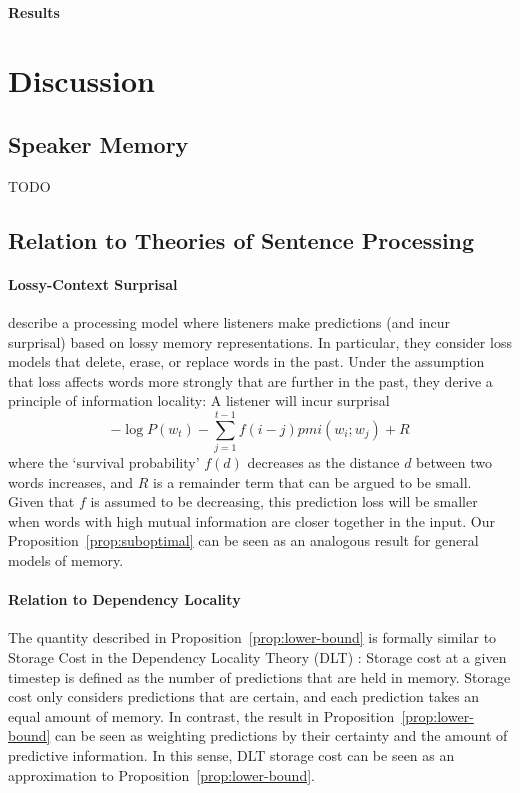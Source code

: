 \documentclass[11pt,letterpaper]{article}
\begin{document}
\paragraph{Results}


\section{Discussion}

\subsection{Speaker Memory}

TODO

\subsection{Relation to Theories of Sentence Processing}


\paragraph{Lossy-Context Surprisal}
\citet{futrell-noisy-context-2017} describe a processing model where listeners make predictions (and incur surprisal) based on lossy memory representations.
In particular, they consider loss models that delete, erase, or replace words in the past.
Under the assumption that loss affects words more strongly that are further in the past, they derive a principle of information locality:
A listener will incur surprisal
$$ -\log P(w_t) - \sum_{j=1}^{t-1} f(i-j) pmi(w_i; w_j) + R$$
where the `survival probability' $f(d)$ decreases as the distance $d$ between two words increases, and $R$ is a remainder term that can be argued to be small.
Given that $f$ is assumed to be decreasing, this prediction loss will be smaller when words with high mutual information are closer together in the input.
Our Proposition~\ref{prop:suboptimal} can be seen as an analogous result for general models of memory.






\paragraph{Relation to Dependency Locality}
The quantity described in Proposition~\ref{prop:lower-bound} is formally similar to Storage Cost in the Dependency Locality Theory (DLT) \citep{gibson-linguistic-1998}: Storage cost at a given timestep is defined as the number of predictions that are held in memory.
Storage cost only considers predictions that are certain, and each prediction takes an equal amount of memory.
In contrast, the result in Proposition~\ref{prop:lower-bound} can be seen as weighting predictions by their certainty and the amount of predictive information.
In this sense, DLT storage cost can be seen as an approximation to Proposition~\ref{prop:lower-bound}.
\end{document}
